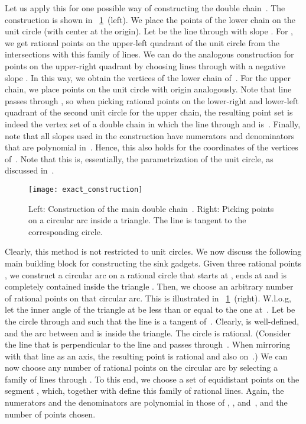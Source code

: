 \documentclass[a4paper,11pt]{article}
\begin{document}
Let us apply this for one possible way of constructing the double chain~.
The construction is shown in \figurename~\ref{fig_exact_construction}~(left).
We place the  points of the lower chain on the unit circle (with center at the origin).
Let  be the line through  with slope .
For , we get  rational points on the upper-left quadrant of the unit circle from the intersections with this family of lines.
We can do the analogous construction for points on the upper-right quadrant by choosing lines through  with a negative slope .
In this way, we obtain the vertices of the lower chain of~.
For the upper chain, we place points on the unit circle with origin  analogously.
Note that line  passes through , so when picking rational points on the lower-right and lower-left quadrant of the second unit circle for the upper chain, the resulting point set is indeed the vertex set of a double chain in which the line through  and  is~.
Finally, note that all slopes used in the construction have numerators and denominators that are polynomial in~.
Hence, this also holds for the coordinates of the vertices of~.
Note that this is, essentially, the parametrization of the unit circle, as discussed in~\cite{canny}.

\begin{figure}
\centering
\texttt{[image: exact\_construction]}
\caption{Left: Construction of the main double chain~.
Right: Picking points on a circular arc inside a triangle. The line  is tangent to the corresponding circle.}
\label{fig_exact_construction}
\end{figure}


Clearly, this method is not restricted to unit circles.
We now discuss the following main building block for constructing the sink gadgets.
Given three rational points , we construct a circular arc on a rational circle that starts at , ends at  and is completely contained inside the triangle .
Then, we choose an arbitrary number of rational points on that circular arc.
This is illustrated in \figurename~\ref{fig_exact_construction}~(right).
W.l.o.g, let the inner angle of the triangle at  be less than or equal to the one at~.
Let  be the circle through  and  such that the line  is a tangent of~.
Clearly,  is well-defined, and the arc between  and  is inside the triangle.
The circle  is rational.
(Consider the line that is perpendicular to the line  and passes through~.
When mirroring  with that line as an axis, the resulting point  is rational and also on~.)
We can now choose any number of rational points on the circular arc by selecting a family of lines through .
To this end, we choose a set of equidistant points on the segment , which, together with  define this family of rational lines.
Again, the numerators and the denominators are polynomial in those of , , and~, and the number of points chosen.
\end{document}
